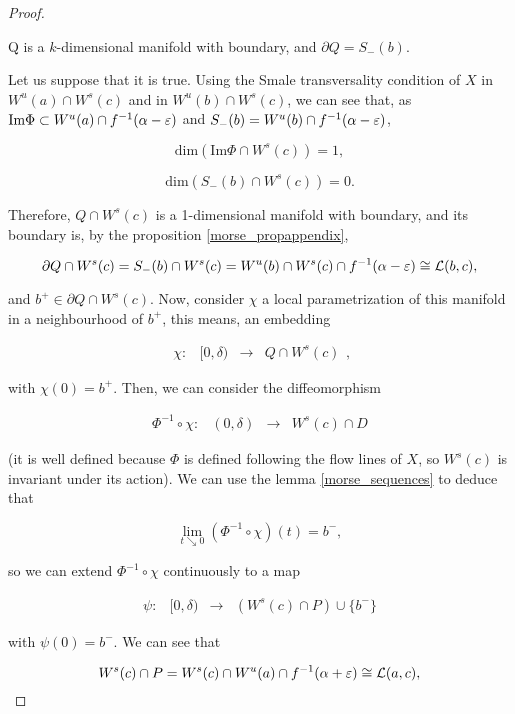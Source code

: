 \begin{proof}
\begin{prop} \label{morse_propappendix}
Q is a $k$-dimensional manifold with boundary, and $\partial Q = S_-(b)$.
\end{prop}

Let us suppose that it is true. Using the Smale transversality condition of $X$ in $W^u(a) \cap W^s(c)$ and in $W^u(b) \cap W^s(c)$, we can see that, as $\text{Im}\Phi \subset W^u(a) \cap f^{-1}(\alpha-\varepsilon)$ and $S_-(b) = W^u(b) \cap f^{-1}(\alpha-\varepsilon)$,

\[\text{dim}(\text{Im}\Phi \cap W^s(c)) = 1 ,\]

\[\text{dim}(S_-(b) \cap W^s(c)) = 0 .\]

Therefore, $Q \cap W^s(c)$ is a 1-dimensional manifold with boundary, and its boundary is, by the proposition \ref{morse_propappendix},

\[\partial Q \cap W^s(c) = S_-(b) \cap W^s(c) = W^u(b) \cap W^s(c) \cap f^{-1}(\alpha-\varepsilon) \cong \mathcal{L}(b,c) ,\]

and $b^+ \in \partial Q \cap W^s(c)$. Now, consider $\chi$ a local parametrization of this manifold in a neighbourhood of $b^+$, this means, an embedding

\[\begin{array}{rccc} \chi : & [0,\delta) & \longrightarrow & Q \cap W^s(c) \end{array} ,\]

with $\chi(0) = b^+$. Then, we can consider the diffeomorphism

\[\begin{array}{rccc} \Phi^{-1} \circ \chi : & (0,\delta) & \longrightarrow & W^s(c) \cap D \end{array}\]

(it is well defined because $\Phi$ is defined following the flow lines of $X$, so $W^s(c)$ is invariant under its action). We can use the lemma \ref{morse_sequences} to deduce that

\[\lim_{t \searrow 0} (\Phi^{-1} \circ \chi)(t) = b^- ,\]

so we can extend $\Phi^{-1} \circ \chi$ continuously to a map

\[\begin{array}{rccc} \psi : & [0,\delta) & \longrightarrow & \left( W^s(c) \cap P \right) \cup \{b^-\} \end{array}\]

with $\psi(0) = b^-$. We can see that

\[W^s(c) \cap P = W^s(c) \cap W^u(a) \cap f^{-1}(\alpha+\varepsilon) \cong \mathcal{L}(a,c) ,\]


\end{proof}
